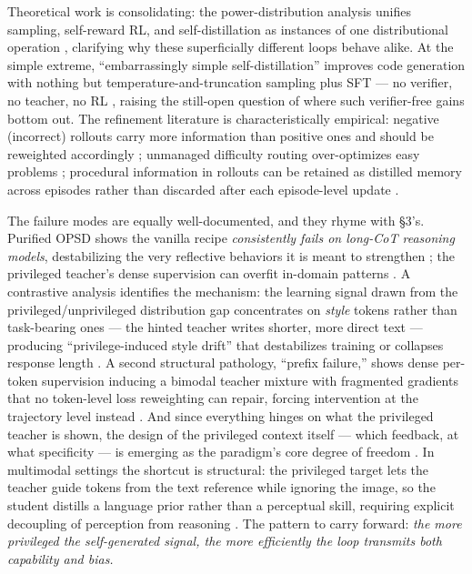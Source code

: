 \documentclass[
  11pt,
]{article}
\begin{document}
Theoretical work is consolidating: the power-distribution analysis
unifies sampling, self-reward RL, and self-distillation as instances of
one distributional operation \citep{tomihari2026power}, clarifying why
these superficially different loops behave alike. At the simple extreme,
``embarrassingly simple self-distillation'' improves code generation
with nothing but temperature-and-truncation sampling plus SFT --- no
verifier, no teacher, no RL \citep{zhang2026embarrassingly}, raising the
still-open question of where such verifier-free gains bottom out. The
refinement literature is characteristically empirical: negative
(incorrect) rollouts carry more information than positive ones and
should be reweighted accordingly \citep{lin2026renio}; unmanaged
difficulty routing over-optimizes easy problems \citep{luo2026drift};
procedural information in rollouts can be retained as distilled memory
across episodes rather than discarded after each episode-level update
\citep{liu2026procedural}.

The failure modes are equally well-documented, and they rhyme with §3's.
Purified OPSD shows the vanilla recipe \emph{consistently fails on
long-CoT reasoning models}, destabilizing the very reflective behaviors
it is meant to strengthen \citep{shen2026purified}; the privileged
teacher's dense supervision can overfit in-domain patterns
\citep{li2026demopsd}. A contrastive analysis identifies the mechanism:
the learning signal drawn from the privileged/unprivileged distribution
gap concentrates on \emph{style} tokens rather than task-bearing ones
--- the hinted teacher writes shorter, more direct text --- producing
``privilege-induced style drift'' that destabilizes training or
collapses response length \citep{pan2026rlcsd}. A second structural
pathology, ``prefix failure,'' shows dense per-token supervision
inducing a bimodal teacher mixture with fragmented gradients that no
token-level loss reweighting can repair, forcing intervention at the
trajectory level instead \citep{jiang2026trajectory}. And since
everything hinges on what the privileged teacher is shown, the design of
the privileged context itself --- which feedback, at what specificity
--- is emerging as the paradigm's core degree of freedom
\citep{kara2026role}. In multimodal settings the shortcut is structural:
the privileged target lets the teacher guide tokens from the text
reference while ignoring the image, so the student distills a language
prior rather than a perceptual skill, requiring explicit decoupling of
perception from reasoning \citep{wang2026seeing}. The pattern to carry
forward: \emph{the more privileged the self-generated signal, the more
efficiently the loop transmits both capability and bias.}
\end{document}
